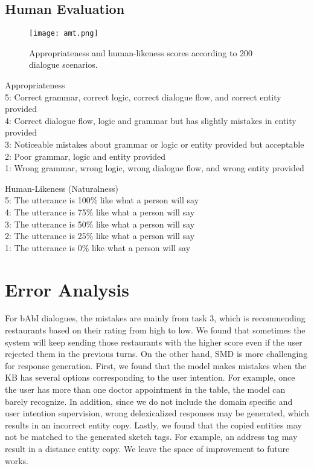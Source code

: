 \documentclass{article} \usepackage{iclr2019_conference,times}
\begin{document}
\subsection{Human Evaluation}
\begin{figure}[h]
\centering
\texttt{[image: amt.png]} \caption{Appropriateness and human-likeness scores according to 200 dialogue scenarios. }
\end{figure}

Appropriateness \\
5: Correct grammar, correct logic, correct dialogue flow, and correct entity provided \\
4: Correct dialogue flow, logic and grammar but has slightly mistakes in entity provided \\
3: Noticeable mistakes about grammar or logic or entity provided but acceptable \\
2: Poor grammar, logic and entity provided \\
1: Wrong grammar, wrong logic, wrong dialogue flow, and wrong entity provided

Human-Likeness (Naturalness) \\
5: The utterance is 100\% like what a person will say \\
4: The utterance is 75\% like what a person will say \\
3: The utterance is 50\% like what a person will say \\
2: The utterance is 25\% like what a person will say \\
1:  The utterance is 0\% like what a person will say \\

\section{Error Analysis}
For bAbI dialogues, the mistakes are mainly from task 3, which is recommending restaurants based on their rating from high to low. We found that sometimes the system will keep sending those restaurants with the higher score even if the user rejected them in the previous turns. On the other hand, SMD is more challenging for response generation. First, we found that the model makes mistakes when the KB has several options corresponding to the user intention. For example, once the user has more than one doctor appointment in the table, the model can barely recognize. In addition, since we do not include the domain specific and user intention supervision, wrong delexicalized responses may be generated, which results in an incorrect entity copy. Lastly, we found that the copied entities may not be matched to the generated sketch tags. For example, an address tag may result in a distance entity copy. We leave the space of improvement to future works.
\end{document}
